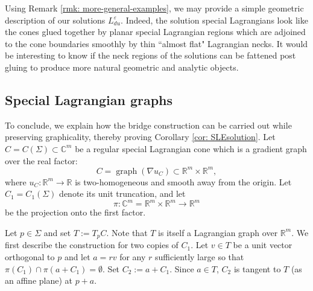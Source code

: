 \documentclass[11pt]{amsart}
\theoremstyle{definition}
\theoremstyle{remark}
\begin{document}
    Using Remark \ref{rmk: more-general-examples}, we may provide a simple geometric description of our solutions $L_{du}^\varepsilon$. Indeed, the solution special Lagrangians look like the cones glued together by planar special Lagrangian regions which are adjoined to the cone boundaries smoothly by thin ``almost flat" Lagrangian necks. It would be interesting to know if the neck regions of the solutions can be fattened post gluing to produce more natural geometric and analytic objects.

\subsection{Special Lagrangian graphs}
To conclude, we explain how the bridge construction can be carried out while preserving graphicality, thereby proving Corollary \ref{cor: SLEsolution}. Let $C=C(\Sigma)\subset\mathbb C^m$ be a regular special Lagrangian cone which is a gradient graph over the real factor:
\[
C=\operatorname{graph}(\nabla u_C)
\subset\mathbb R^m\times\mathbb R^m,
\]
where $u_C:\mathbb R^m\to\mathbb R$ is two-homogeneous and smooth away from the origin. Let $C_1=C_1(\Sigma)$ denote its unit truncation, and let
\[
\pi:\mathbb C^m=\mathbb R^m\times\mathbb R^m\longrightarrow\mathbb R^m
\]
be the projection onto the first factor.

Let $p\in \Sigma$ and set $T:=T_pC$.
Note that $T$ is itself a Lagrangian graph over $\mathbb{R}^m$. We first describe the construction for two copies of $C_1$. Let $v\in T$ be a unit vector orthogonal to $p$ and let $a=rv$ for any $r$ sufficiently large so that $\pi(C_1)\cap \pi(a+C_1)=\emptyset$.
Set $C_2:=a+C_1$. Since $a\in T$, $C_2$ is tangent to $T$ (as an affine plane) at $p+a$.
\end{document}
